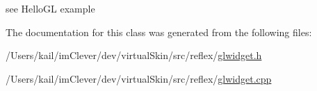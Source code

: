 see HelloGL example 

The documentation for this class was generated from the following files:\begin{DoxyCompactItemize}
\item 
/Users/kail/imClever/dev/virtualSkin/src/reflex/\hyperlink{glwidget_8h}{glwidget.h}\item 
/Users/kail/imClever/dev/virtualSkin/src/reflex/\hyperlink{glwidget_8cpp}{glwidget.cpp}\end{DoxyCompactItemize}
